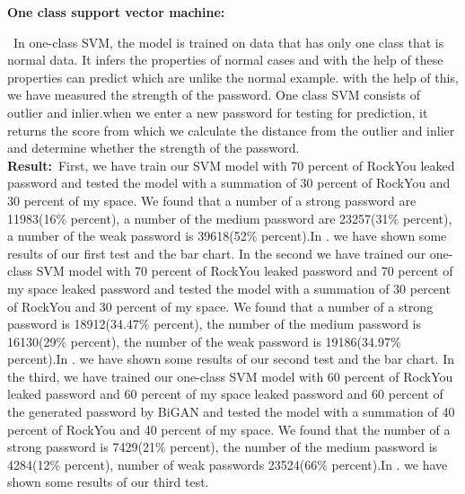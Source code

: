 \documentclass[runningheads]{llncs}
\begin{document}
\newline
\hfill \break
\newline
\textbf{One class support vector machine:}
{~In one-class SVM, the model is trained on data that has only one class that is normal data. It infers the properties of normal cases and with the help of these properties can predict which are unlike the normal example. with the help of this, we have measured the strength of the password. One class SVM consists of outlier and inlier.when we enter a new password for testing for prediction, it returns the score from which we calculate the distance from the outlier and inlier and determine whether the strength of the password.\\
\hfill \break
\textbf{Result:}~First, we have train our SVM model with 70 percent of RockYou leaked password and tested the model with a summation of 30 percent of RockYou and 30 percent of my space. We found that a number of a strong password are 11983(16\% percent), a number of the medium password are 23257(31\% percent), a number of the weak password is 39618(52\% percent).In  . we have shown some results of our first test and the bar chart.
\newline
In the second we have trained our one-class SVM model with 70 percent of RockYou leaked password and 70 percent of my space leaked password and tested the model with a summation of 30 percent of RockYou and 30 percent of my space. We found that a number of a strong password is 18912(34.47\% percent), the number of the medium password is 16130(29\% percent), the number of the weak password is 19186(34.97\% percent).In  . we have shown some results of our second test and the bar chart.
\newline
In the third, we have trained our one-class SVM model with 60 percent of RockYou leaked password and 60 percent of my space leaked password and 60 percent of the generated password by BiGAN and tested the model with a summation of 40 percent of RockYou and 40 percent of my space. We found that the number of a strong password is 7429(21\% percent), the number of the medium password is 4284(12\% percent), number of weak passwords 23524(66\% percent).In . we have shown some results of our third test.
\begin{figure}
  \centering
  \begin{minipage}[b]{0.4\textwidth}
  \begin{mdframed}

\end{mdframed}
\end{minipage}
\end{figure}}
\end{document}

